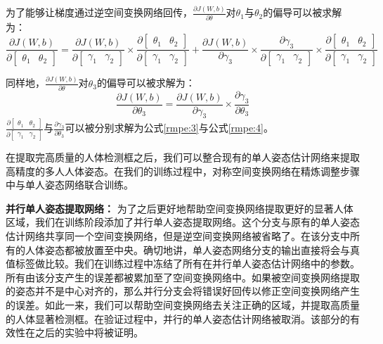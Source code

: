 为了能够让梯度通过逆空间变换网络回传，$\frac{\partial J(W, b)}{\partial \theta}$对$\theta_1$与$\theta_2$的偏导可以被求解为：
\begin{equation*}
\label{rmpe:5}
\frac{\partial J(W, b)}{\partial \begin{bmatrix} \theta_1 & \theta_2\end{bmatrix}} = 
\frac{\partial J(W, b)}{\partial \begin{bmatrix} \gamma_1 & \gamma_2\end{bmatrix}} \times \frac{\partial \begin{bmatrix} \theta_1 & \theta_2\end{bmatrix}}{\partial \begin{bmatrix} \gamma_1 & \gamma_2\end{bmatrix}} + \frac{\partial J(W, b)}{\partial \gamma_3} \times \frac{\partial \gamma_3}{\partial \begin{bmatrix} \gamma_1 & \gamma_2\end{bmatrix}} \times  \frac{\partial \begin{bmatrix} \theta_1 & \theta_2\end{bmatrix}}{\partial \begin{bmatrix} \gamma_1 & \gamma_2\end{bmatrix}}
\end{equation*}

同样地，$\frac{\partial J(W, b)}{\partial \theta}$对$\theta_3$的偏导可以被求解为：
\begin{equation*}
\label{rmpe:6}
\frac{\partial J(W,b)}{\partial \theta_3} = \frac{\partial J(W,b)}{\partial \gamma_3} \times \frac{\partial \gamma_3}{\partial \theta_3}
\end{equation*}
$\frac{\partial \begin{bmatrix} \theta_1 & \theta_2\end{bmatrix}}{\partial \begin{bmatrix} \gamma_1 & \gamma_2\end{bmatrix}}$与$\frac{\partial \gamma_3}{\partial \theta_3}$可以被分别求解为公式\eqref{rmpe:3}与公式\eqref{rmpe:4}。

在提取完高质量的人体检测框之后，我们可以整合现有的单人姿态估计网络来提取高精度的多人人体姿态。在我们的训练过程中，对称空间变换网络在精炼调整步骤中与单人姿态网络联合训练。

\textbf{并行单人姿态提取网络：} 为了之后更好地帮助空间变换网络提取更好的显著人体区域，我们在训练阶段添加了并行单人姿态提取网络。这个分支与原有的单人姿态估计网络共享同一个空间变换网络，但是逆空间变换网络被省略了。在该分支中所有的人体姿态都被放置至中央。确切地讲，单人姿态网络分支的输出直接将会与真值标签做比较。我们在训练过程中冻结了所有在并行单人姿态估计网络中的参数。所有由该分支产生的误差都被累加至了空间变换网络中。如果被空间变换网络提取的姿态并不是中心对齐的，那么并行分支会将错误好回传以修正空间变换网络产生的误差。如此一来，我们可以帮助空间变换网络去关注正确的区域，并提取高质量的人体显著检测框。在验证过程中，并行的单人姿态估计网络被取消。该部分的有效性在之后的实验中将被证明。

